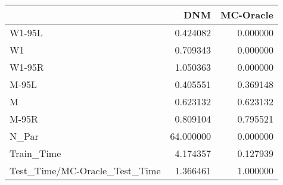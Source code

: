 \begin{tabular}{lrr}
\toprule
{} &        DNM &  MC-Oracle \\
\midrule
W1-95L                        &   0.424082 &   0.000000 \\
W1                            &   0.709343 &   0.000000 \\
W1-95R                        &   1.050363 &   0.000000 \\
M-95L                         &   0.405551 &   0.369148 \\
M                             &   0.623132 &   0.623132 \\
M-95R                         &   0.809104 &   0.795521 \\
N\_Par                         &  64.000000 &   0.000000 \\
Train\_Time                    &   4.174357 &   0.127939 \\
Test\_Time/MC-Oracle\_Test\_Time &   1.366461 &   1.000000 \\
\bottomrule
\end{tabular}
